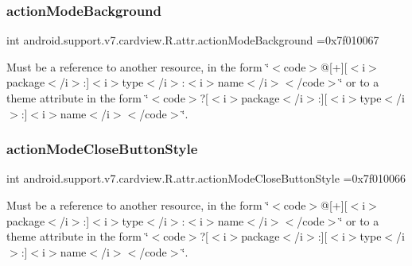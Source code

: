 \subsubsection{\texorpdfstring{action\+Mode\+Background}{actionModeBackground}}
{\footnotesize\ttfamily int android.\+support.\+v7.\+cardview.\+R.\+attr.\+action\+Mode\+Background =0x7f010067\hspace{0.3cm}{\ttfamily [static]}}

Must be a reference to another resource, in the form \char`\"{}$<$code$>$@\mbox{[}+\mbox{]}\mbox{[}$<$i$>$package$<$/i$>$\+:\mbox{]}$<$i$>$type$<$/i$>$\+:$<$i$>$name$<$/i$>$$<$/code$>$\char`\"{} or to a theme attribute in the form \char`\"{}$<$code$>$?\mbox{[}$<$i$>$package$<$/i$>$\+:\mbox{]}\mbox{[}$<$i$>$type$<$/i$>$\+:\mbox{]}$<$i$>$name$<$/i$>$$<$/code$>$\char`\"{}. \mbox{\label{classandroid_1_1support_1_1v7_1_1cardview_1_1R_1_1attr_ab744fe0cdbca0b2272aae43d708223b3}} 
\subsubsection{\texorpdfstring{action\+Mode\+Close\+Button\+Style}{actionModeCloseButtonStyle}}
{\footnotesize\ttfamily int android.\+support.\+v7.\+cardview.\+R.\+attr.\+action\+Mode\+Close\+Button\+Style =0x7f010066\hspace{0.3cm}{\ttfamily [static]}}

Must be a reference to another resource, in the form \char`\"{}$<$code$>$@\mbox{[}+\mbox{]}\mbox{[}$<$i$>$package$<$/i$>$\+:\mbox{]}$<$i$>$type$<$/i$>$\+:$<$i$>$name$<$/i$>$$<$/code$>$\char`\"{} or to a theme attribute in the form \char`\"{}$<$code$>$?\mbox{[}$<$i$>$package$<$/i$>$\+:\mbox{]}\mbox{[}$<$i$>$type$<$/i$>$\+:\mbox{]}$<$i$>$name$<$/i$>$$<$/code$>$\char`\"{}. \mbox{\label{classandroid_1_1support_1_1v7_1_1cardview_1_1R_1_1attr_a9197804bc6204b298b271ae47a72529a}} 
